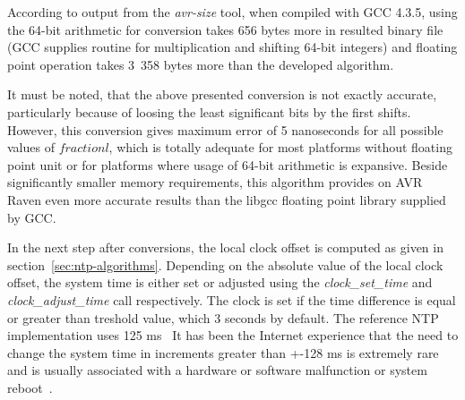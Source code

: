 According to output from the {\it{avr-size}} tool,
when compiled with GCC 4.3.5,
using the 64-bit arithmetic for conversion
takes 656 bytes more in %
resulted binary file (GCC supplies routine for multiplication and shifting 64-bit integers)
and floating point operation takes 3~358 bytes more
than the developed algorithm.

It must be noted, that the above presented conversion is not exactly accurate, particularly
because of loosing the least significant bits by the first shifts.
However, this conversion gives maximum error of 5 nanoseconds for all possible values of $fractionl$,
which is totally adequate for most platforms without floating point unit or
for platforms where usage of 64-bit arithmetic is expansive.
Beside significantly smaller memory requirements,
this algorithm provides on AVR Raven even more accurate results than the libgcc
floating point library supplied by GCC.


In the next step after conversions, the local clock offset is computed
as given in section~\ref{sec:ntp-algorithms}.
Depending on the absolute value of the local clock offset,
the system time is either set or adjusted using the {\it{clock\_set\_time}}
and {\it{clock\_adjust\_time}} call respectively.
The clock is set if the time difference is equal or greater than
treshold value, which 3 seconds by default. %
The reference NTP implementation uses 125 ms~\cite{rfc5905}
It has been the Internet
experience that the need to change the system time in increments
greater than +-128 ms is extremely rare and is usually associated
with a hardware or software malfunction or system reboot~\cite{rfc1589}.


%
%
